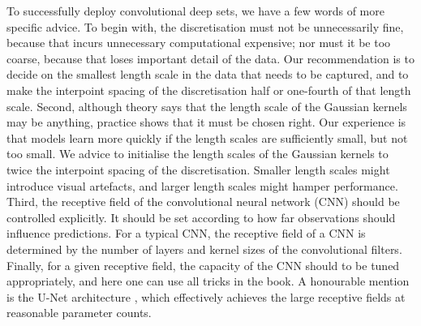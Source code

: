 \documentclass[12pt, twoside]{report}
\begin{document}
To successfully deploy convolutional deep sets,
we have a few words of more specific advice.
To begin with, the discretisation must not be unnecessarily fine, because that incurs unnecessary computational expensive;
nor must it be too coarse, because that loses important detail of the data.
Our recommendation is to decide on the smallest length scale in the data that needs to be captured, and to make the interpoint spacing of the discretisation half or one-fourth of that length scale.
Second, 
although theory says that the length scale of the Gaussian kernels may be anything,
practice shows that it must be chosen right.
Our experience is that models learn more quickly if the length scales are sufficiently small, but not too small.
We advice to initialise the length scales of the Gaussian kernels to twice the interpoint spacing of the discretisation.
Smaller length scales might introduce visual artefacts,
and larger length scales might hamper performance.
%
Third, the receptive field of the convolutional neural network (CNN) should be controlled explicitly.
It should be set according to how far observations should influence predictions.
For a typical CNN, the receptive field of a CNN is determined by the number of layers and kernel sizes of the convolutional filters. 
Finally, for a given receptive field, the capacity of the CNN should to be tuned appropriately, and here one can use all tricks in the book.
A honourable mention is the U-Net architecture \parencite{Ronneberger:2015:U-Net_Convolutional_Networks_for_Biomedical}, which effectively achieves the large receptive fields at reasonable parameter counts.
\end{document}
